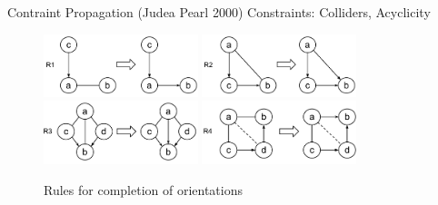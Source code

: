 \begin{frame}{Contraint Propagation (Judea Pearl 2000)}
Constraints: Colliders, Acyclicity
 \begin{figure}[H]
  \centering
  \hfill\includegraphics[width=0.4\textwidth]{imgs/R1}%
  \hfill\includegraphics[width=0.4\textwidth]{imgs/R2}\hspace*{\fill}\newline
  \vspace{0.5mm}
  \hspace*{\fill}\includegraphics[width=0.4\textwidth]{imgs/R3}%
  \hfill\includegraphics[width=0.4\textwidth]{imgs/R4}\hspace*{\fill}
  \caption{Rules for completion of orientations}
 \end{figure}
\end{frame}
